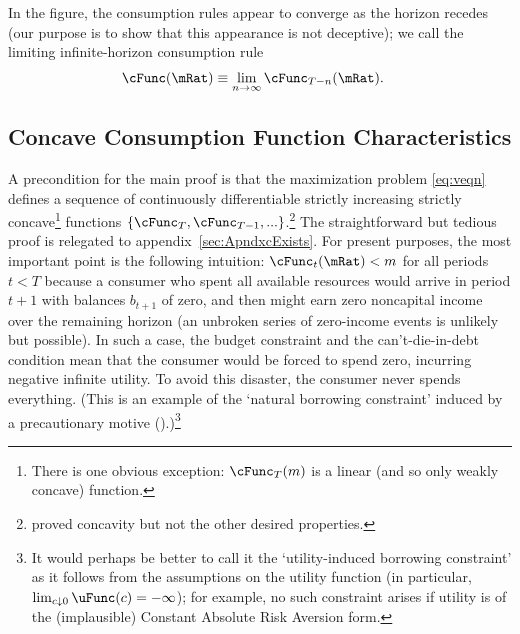 \documentclass[BufferStockTheory]{subfiles}
\begin{document}
\hypertarget{Symbols}{}



\providecommand{\figName}{Convergence-of-the-Consumption-Rules} %
\providecommand{\figFile}{cFuncsConverge} %
\hypertarget{\figFile}{}
\hypertarget{\figName}{}

In the figure, the consumption rules appear to converge as the horizon
recedes (our purpose is to show that this appearance is not deceptive); we
call the limiting infinite-horizon consumption rule
\begin{align}
  \cFunc(\mRat)  & \equiv  \lim_{n \rightarrow \infty} \cFunc_{T-n}(\mRat).
\end{align}

\hypertarget{Concave-Consumption-Function-Characteristics}{}
\subsection{Concave Consumption Function Characteristics}\label{sec:cExists}

A precondition for the main proof is that the maximization problem \eqref{eq:veqn} defines a sequence of continuously differentiable strictly increasing strictly concave\footnote{There is one obvious exception: $\cFunc_{T}(m)$ is a linear (and so only weakly concave) function.} functions $\{\cFunc_{T},\cFunc_{T-1},...\}$.\footnote{\cite{ckConcavity} proved concavity but not the other desired properties.}  The straightforward but tedious proof is relegated to appendix~\ref{sec:ApndxcExists}.  For present purposes, the most important point is the following intuition: $\cFunc_{t}(\mRat) < m$ for all periods $t < T$ because a consumer who spent all available resources would arrive in period $t+1$ with balances $b_{t+1}$ of zero, and then might earn zero noncapital income over the remaining horizon (an unbroken series of zero-income events is unlikely but possible).  In such a case, the budget constraint and the can't-die-in-debt condition mean that the consumer would be forced to spend zero, incurring negative infinite utility.  To avoid this disaster, the consumer never spends everything.  (This is an example of the `natural borrowing constraint' induced by a precautionary motive (\cite{zeldesStochastic}).)\footnote{It would perhaps be better to call it the `utility-induced borrowing constraint' as it follows from the assumptions on the utility function (in particular, $\lim_{c \downarrow 0} \uFunc(c)=-\infty$); for example, no such constraint arises if utility is of the (implausible) Constant Absolute Risk Aversion form.}
\end{document}
